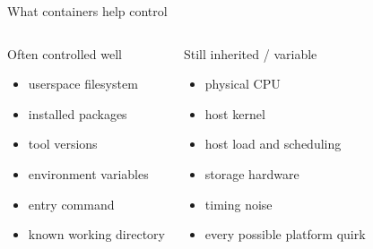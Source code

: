 \documentclass[aspectratio=169,11pt]{beamer}
\begin{document}
\begin{frame}{What containers help control}
\begin{columns}[T,onlytextwidth]
\begin{exampleblock}{Often controlled well}
\begin{itemize}
  \item userspace filesystem
  \item installed packages
  \item tool versions
  \item environment variables
  \item entry command
  \item known working directory
\end{itemize}
\end{exampleblock}

\begin{alertblock}{Still inherited / variable}
\begin{itemize}
  \item physical CPU
  \item host kernel
  \item host load and scheduling
  \item storage hardware
  \item timing noise
  \item every possible platform quirk
\end{itemize}
\end{alertblock}
\end{columns}
\end{frame}
\end{document}
